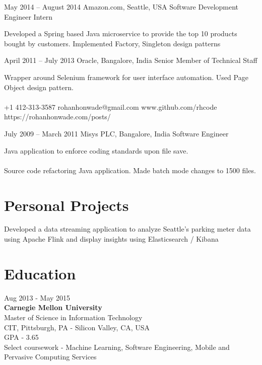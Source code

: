 \documentclass{tccv}
\begin{document}
\begin{eventlist}
\item{May 2014 -- August 2014}
     {Amazon.com, Seattle, USA}
     {Software Development Engineer Intern}

Developed a Spring based Java microservice to provide the top 10 products bought by customers. Implemented Factory, Singleton design patterns

\item{April 2011 -- July 2013}
     {Oracle, Bangalore, India}
     {Senior Member of Technical Staff}

Wrapper around Selenium framework for user interface automation. Used Page Object design pattern.\\
\\

    {+1 412-313-3587}
    {rohanhonwade@gmail.com}
    {www.github.com/rhcode}
    {https://rohanhonwade.com/posts/}

\item{July 2009 -- March 2011}
     {Misys PLC, Bangalore, India}
     {Software Engineer}

Java application to enforce coding standards upon file save.\\
\\

Source code refactoring Java application. Made batch mode changes to 1500 files.\\
\end{eventlist}

\vspace{-0.2in}
\section{Personal Projects}
Developed a data streaming application to analyze Seattle's parking meter data using Apache Flink and display insights using Elasticsearch / Kibana


\section{Education}

{\hfill\sc Aug 2013 - May 2015}\\
\textbf{Carnegie Mellon University}\\ 
Master of Science in Information Technology\\
CIT, Pittsburgh, PA - Silicon Valley, CA, USA\\
GPA - 3.65\\
Select coursework - Machine Learning, Software Engineering, Mobile and Pervasive Computing Services\\
\end{document}
